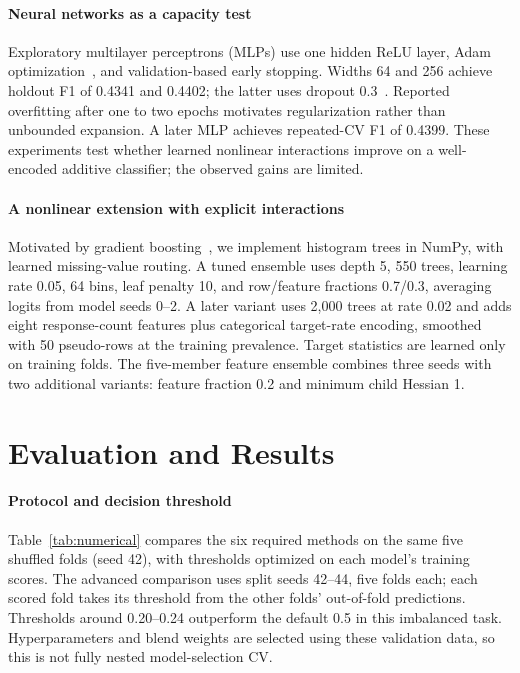 \documentclass[10pt,conference,compsocconf]{IEEEtran}
\begin{document}
\paragraph{Neural networks as a capacity test}
Exploratory multilayer perceptrons (MLPs) use one hidden ReLU layer, Adam
optimization~\cite{kingma2015adam}, and validation-based early stopping.
Widths 64 and 256 achieve holdout F1 of 0.4341 and 0.4402; the latter uses
dropout 0.3~\cite{srivastava2014dropout}. Reported overfitting after one to two
epochs motivates regularization rather than unbounded expansion. A later MLP
achieves repeated-CV F1 of 0.4399. These experiments test whether learned
nonlinear interactions improve on a well-encoded additive classifier;
the observed gains are limited.

\paragraph{A nonlinear extension with explicit interactions}
Motivated by gradient boosting~\cite{chen2016xgboost,ke2017lightgbm}, we implement
histogram trees in NumPy, with learned missing-value routing. A tuned ensemble
uses depth 5, 550 trees, learning rate 0.05, 64 bins, leaf penalty 10,
and row/feature fractions 0.7/0.3, averaging logits from model seeds 0--2.
A later variant uses 2,000 trees at rate 0.02 and adds eight response-count
features plus categorical target-rate encoding, smoothed with 50 pseudo-rows
at the training prevalence. Target statistics are learned only on training
folds. The five-member feature ensemble combines three seeds with two
additional variants: feature fraction 0.2 and minimum child Hessian 1.

\section{Evaluation and Results}
\paragraph{Protocol and decision threshold}
Table~\ref{tab:numerical} compares the six required methods on the same five
shuffled folds (seed 42), with thresholds optimized on each model's training
scores. The advanced comparison uses split seeds 42--44, five folds each;
each scored fold takes its threshold from the other folds' out-of-fold
predictions. Thresholds around 0.20--0.24 outperform the default 0.5 in this
imbalanced task. Hyperparameters and blend weights are selected using these
validation data, so this is not fully nested model-selection CV.
\end{document}
